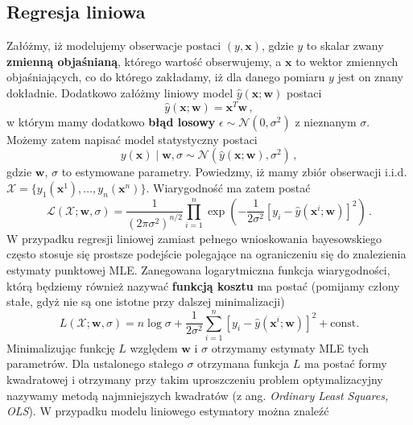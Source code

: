 \documentclass{myclass}
\numberwithin{equation}{section}
\begin{document}
\subsection{Regresja liniowa}

Załóżmy, iż modelujemy obserwacje postaci \((y, \mathbf{x})\), gdzie \(y\) to skalar zwany
\textbf{zmienną objaśnianą}, którego wartość obserwujemy, a \(\mathbf{x}\) to wektor zmiennych
objaśniających, co do którego zakładamy, iż dla danego pomiaru \(y\) jest on znany dokładnie.
Dodatkowo załóżmy liniowy model \(\hat{y}(\mathbf{x};\mathbf{w})\) postaci
\begin{equation}
    \hat{y}(\mathbf{x};\mathbf{w}) = \mathbf{x}^T\mathbf{w}\,,
\end{equation}
w którym mamy dodatkowo \textbf{błąd losowy} \(\epsilon \sim \mathcal{N}(0, \sigma^2)\) z nieznanym
\(\sigma\). Możemy zatem napisać model statystyczny postaci
\begin{equation}
    y(\mathbf{x}) \mid \mathbf{w}, \sigma \sim \mathcal{N}(\hat{y}(\mathbf{x}; \mathbf{w}), \sigma^2)\,,
\end{equation}
gdzie \(\mathbf{w}\), \(\sigma\) to estymowane parametry. Powiedzmy, iż mamy zbiór obserwacji i.i.d.
\(\mathcal{X} = \{y_1(\mathbf{x}^1), \ldots, y_n(\mathbf{x}^n)\}\). Wiarygodność ma zatem postać
\begin{equation}\boxed{
    \mathcal{L}(\mathcal{X} ; \mathbf{w}, \sigma) = \frac{1}{(2\pi\sigma^2)^{n/2}} \prod_{i=1}^n \exp\left(-\frac{1}{2\sigma^2}\left[y_i - \hat{y}(\mathbf{x}^i; \mathbf{w})\right]^2\right)\,.
}\end{equation}
W przypadku regresji liniowej zamiast pełnego wnioskowania bayesowskiego często stosuje się prostsze
podejście polegające na ograniczeniu się do znalezienia estymaty punktowej MLE. Zanegowana
logarytmiczna funkcja wiarygodności, którą będziemy również nazywać \textbf{funkcją kosztu} ma
postać (pomijamy człony stałe, gdyż nie są one istotne przy dalszej minimalizacji)
\begin{equation}\boxed{
    L(\mathcal{X}; \mathbf{w}, \sigma) = n\log\sigma + \frac{1}{2\sigma^2}\sum_{i=1}^n \left[y_i - \hat{y}(\mathbf{x}^i; \mathbf{w})\right]^2 + \mathrm{const.}
}\end{equation}
Minimalizując funkcję \(L\) względem \(\mathbf{w}\) i \(\sigma\) otrzymamy estymaty MLE tych
parametrów. Dla ustalonego stałego \(\sigma\) otrzymana funkcja \(L\) ma postać formy kwadratowej i
otrzymany przy takim uproszczeniu problem optymalizacyjny nazywamy metodą najmniejszych kwadratów (z
ang. \textit{Ordinary Least Squares, OLS}). W przypadku modelu liniowego estymatory można znaleźć
\end{document}
